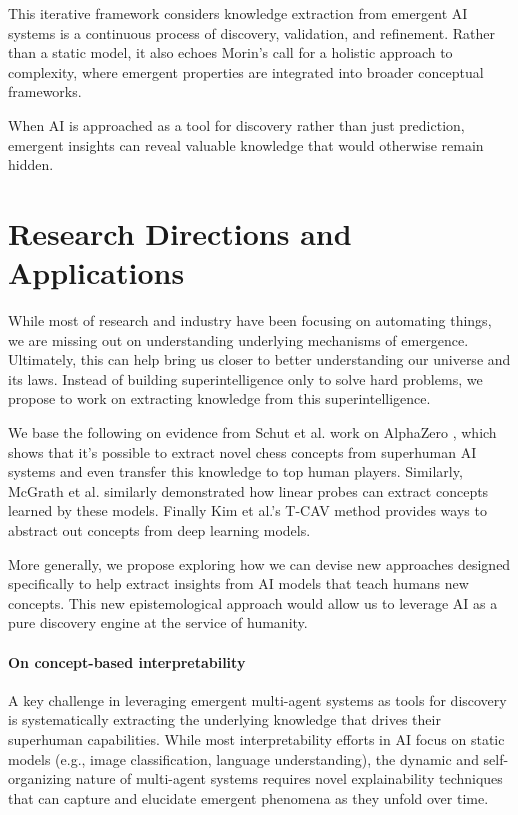 \documentclass[11pt]{article}
\begin{document}
This iterative framework considers knowledge extraction from emergent AI systems is a continuous process of discovery, validation, and refinement. Rather than a static model, it also echoes Morin’s call for a holistic approach to complexity, where emergent properties are integrated into broader conceptual frameworks.

When AI is approached as a tool for discovery rather than just prediction, emergent insights can reveal valuable knowledge that would otherwise remain hidden. 

\section{Research Directions and Applications}
While most of research and industry have been focusing on automating things, we are missing out on understanding underlying mechanisms of emergence. Ultimately, this can help bring us closer to better understanding our universe and its laws.
Instead of building superintelligence only to solve hard problems, we propose to work on extracting knowledge from this superintelligence.

We base the following on evidence from Schut et al. work on AlphaZero \cite{schut}, which shows that it's possible to extract novel chess concepts from superhuman AI systems and even transfer this knowledge to top human players. Similarly, McGrath et al. \cite{alphazero-chess} similarly demonstrated how linear probes can extract concepts learned by these models. Finally Kim et al.'s T-CAV \cite{tcav} method provides ways to abstract out concepts from deep learning models. 

More generally, we propose exploring how we can devise new approaches designed specifically to help extract insights from AI models that teach humans new concepts.
This new epistemological approach would allow us to leverage AI as a pure discovery engine at the service of humanity.

\paragraph{On concept-based interpretability} A key challenge in leveraging emergent multi-agent systems as tools for discovery is systematically extracting the underlying knowledge that drives their superhuman capabilities. While most interpretability efforts in AI focus on static models (e.g., image classification, language understanding), the dynamic and self-organizing nature of multi-agent systems requires novel explainability techniques that can capture and elucidate emergent phenomena as they unfold over time.
\end{document}
